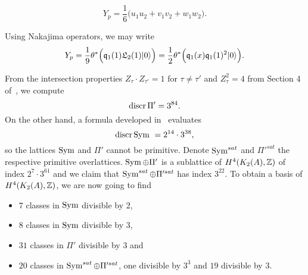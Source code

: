 \begin{corollary}\label{Classuvw}
\begin{equation} \label{YSym}
Y_p =  \frac{1}{6}\Big(u_1u_2 + v_1v_2 +  w_1 w_2 \Big).
\end{equation}
\end{corollary}
\begin{remark}
Using Nakajima operators, we may write
\begin{gather}
Y_p = \frac{1}{9} \theta^*\Big( \mathfrak{q}_1(1)\mathfrak L_2(1) |0\rangle \Big) =  \frac{1}{2}\theta^*\Big(\mathfrak{q}_1(x)\mathfrak{q}_1(1)^2|0\rangle\Big).
\end{gather}
\end{remark}

From the intersection properties $Z_\tau \cdot Z_{\tau'} = 1$ for $\tau\neq \tau'$ and $Z_\tau^2 = 4$ from Section 4 of~\cite{Hassett}, we compute
\begin{equation}
 \operatorname{discr} \Pi' = 3^{84}.
 \label{discrPi}
\end{equation}
On the other hand, a formula developed in~\cite{Kapfer} evaluates
\begin{equation} \label{DiscrSym}
\operatorname{discr} \operatorname{Sym} \ = 2^{14}\cdot 3^{38},
\end{equation}
so the lattices $\operatorname{Sym}$ and $\Pi'$ cannot be primitive. Denote $\operatorname{Sym}^{sat}$ and $\Pi'^{sat}$ the respective primitive overlattices. $\operatorname{Sym} \oplus\Pi'$ is a sublattice of $H^4(K_{ 2 }( A ),\mathbb{Z})$ of index $2^{7}\cdot 3^{61}$ and we claim that $\operatorname{Sym}^{sat}\oplus \Pi'^{sat}$ has index $3^{22}$. To obtain a basis of $H^4(K_{ 2 }( A ),\mathbb{Z})$, we are now going to find
\begin{itemize}
 \item $7$ classes in $\operatorname{Sym}$ divisible by $2$,
 \item $8$ classes in $\operatorname{Sym}$ divisible by $3$,
 \item $31$ classes in $\Pi'$ divisible by $3$ and
 \item $20$ classes in $\operatorname{Sym}^{sat}\oplus \Pi'^{sat}$, one divisible by $3^3$ and $19$ divisible by $3$.
\end{itemize}

